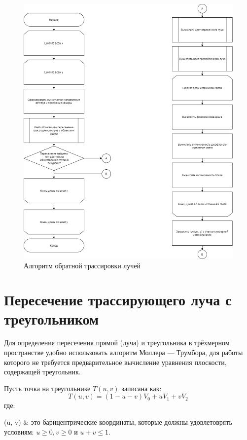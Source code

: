 \documentclass[12pt,a4paper,oneside]{report}
\makeatletter
\newenvironment{conditions*}
{\par\vspace{\abovedisplayskip}\noindent
	\tabularx{\columnwidth}{>{$}l<{$} @{${}-{}$} >{\raggedright\arraybackslash}X}}
{\endtabularx\par\vspace{\belowdisplayskip}}
\makeatother
\begin{document}
	\begin{figure}[H]
		\centering
		\includegraphics[scale=0.5]{trace}
		\caption{Алгоритм обратной трассировки лучей}
		\label{fig:z}
	\end{figure}

	\section{Пересечение трассирующего луча с треугольником}
	 \quad Для определения пересечения прямой (луча) и треугольника в трёхмерном пространстве удобно использовать алгоритм Моллера — Трумбора, для работы которого не требуется предварительное вычисление уравнения плоскости, содержащей треугольник.
	
	 Пусть точка на треугольнике $T(u, v)$ записана как:
	\begin{equation}
	T(u,v) = (1 - u - v) V_0 + u  V_1 + v  V_2
	\end{equation}
	где:
	\begin{conditions*}
		(u, v)     &  это барицентрические координаты, которые должны удовлетоврять условиям: $u \geqslant 0, v \geqslant 0$ и $ u + v \leqslant 1$. \\
	\end{conditions*}
	
\end{document}
